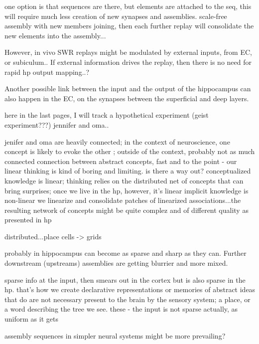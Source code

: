   one option is that sequences are there, but elements are attached to the seq,
  this will require much less creation of new synapses and assemblies.
  scale-free assembly with new members joining, then each further replay will
  consolidate the new elements into the assembly...
  
  However, in vivo SWR replays
  might be modulated by external inputs, from EC, or subiculum..  If external
  information drives the replay, then there is no need for rapid hp output
  mapping..?

  Another possible link between the input and the output of the hippocampus can
  also happen in the EC, on the synapses between the superficial and deep
  layers.


here in the last pages, I will track a hypothetical experiment (geist experiment???)
jennifer and oma..

jenifer and oma are heavily connected; in the context of neuroscience, one concept is
likely to evoke the other ; outside of the context, probably not as much connected
  connection between abstract concepts, fast and to the point
  - our linear thinking is kind of boring and limiting. is there a way out?
  conceptualized knowledge is linear; thinking relies on the distributed net of concepts that can bring surprises;
  once we live in the hp, however, it's linear
  implicit knowledge is non-linear
  we linearize and consolidate patches of linearized associations...the resulting network of concepts might be quite complez and of different quality as presented in hp


  distributed...place cells -> grids


  probably in hippocampus can become as sparse and sharp as they can. Further downstream (upstreams) assemblies are getting blurrier and more mixed.

  sparse info at the input, then smears out in the cortex but is also sparse in the hp. that's how we create declarative representations or memories of abstract ideas that do are not necessary present to the brain by the sensory system; a place, or a word describing the tree we see. these 
  - the input is not sparse actually, as uniform as it gets

  assembly sequences in simpler neural systems might be more prevailing?

